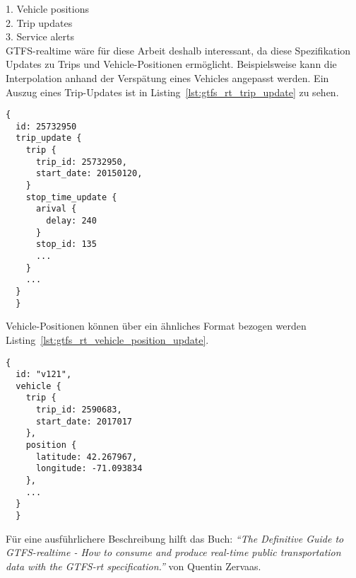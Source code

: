       1. Vehicle positions\\
      2. Trip updates\\
      3. Service alerts\\

      GTFS-realtime wäre für diese Arbeit deshalb interessant, da diese Spezifikation Updates zu Trips und Vehicle-Positionen ermöglicht. Beispielsweise kann die Interpolation anhand der Verspätung eines Vehicles angepasst werden. Ein Auszug eines Trip-Updates ist in Listing~\ref{lst:gtfs_rt_trip_update} zu sehen.

      \begin{lstlisting}[captionpos=b, caption={Auszug eines GTFS-realtime Trip Updates von MBTA},label={lst:gtfs_rt_trip_update}]
  {
  id: 25732950
  trip_update {
    trip {
      trip_id: 25732950,
      start_date: 20150120,
    }
    stop_time_update {
      arival {
        delay: 240
      }
      stop_id: 135
      ...
    }
    ...
  }
  }
    \end{lstlisting}

    Vehicle-Positionen können über ein ähnliches Format bezogen werden Listing~\ref{lst:gtfs_rt_vehicle_position_update}.

    \begin{lstlisting}[captionpos={b},caption={Auszug eines GTFS-realtime Vehicle-Position Updates von MBTA},label={lst:gtfs_rt_vehicle_position_update}]
  {
  id: "v121",
  vehicle {
    trip {
      trip_id: 2590683,
      start_date: 2017017
    },
    position {
      latitude: 42.267967,
      longitude: -71.093834
    },
    ...
  }
  }
    \end{lstlisting}

  Für eine ausführlichere Beschreibung hilft das Buch: \textit{"`The Definitive Guide to GTFS-realtime - How to consume and produce real-time public transportation data with the GTFS-rt specification."'}\parencite{zervaas_realtime} von Quentin Zervaas.\\

